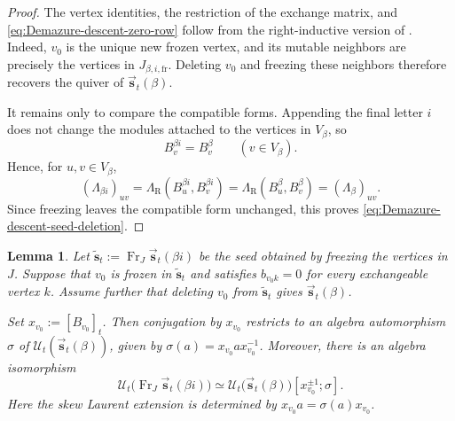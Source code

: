 \documentclass[12pt, reqno]{amsart}
\theoremstyle{plain}
\newtheorem{lemma}[theorem]{Lemma}
\theoremstyle{definition}
\numberwithin{equation}{section}
\newcommand{\LambdaR}{\Lambda_{\mathrm R}}
\begin{document}
\begin{proof}
The vertex identities, the restriction of the exchange matrix, and
\eqref{eq:Demazure-descent-zero-row} follow from the right-inductive
version of
\cite[Lemma~4.47 and Remark~4.48]{casals2025cluster}. Indeed, \(v_0\)
is the unique new frozen vertex, and its mutable neighbors are
precisely the vertices in \(J_{\beta,i,\mathrm{fr}}\). Deleting
\(v_0\) and freezing these neighbors therefore recovers the quiver of
\(\overrightarrow{\mathbf s}_t(\beta)\).

It remains only to compare the compatible forms. Appending the final
letter \(i\) does not change the modules attached to the vertices in
\(V_\beta\), so
\[
    B_v^{\beta i}=B_v^\beta
    \qquad(v\in V_\beta).
\]
Hence, for \(u,v\in V_\beta\),
\[
    (\Lambda_{\beta i})_{uv}
    =
    \LambdaR(B_u^{\beta i},B_v^{\beta i})
    =
    \LambdaR(B_u^\beta,B_v^\beta)
    =
    (\Lambda_\beta)_{uv}.
\]
Since freezing leaves the compatible form unchanged, this proves
\eqref{eq:Demazure-descent-seed-deletion}.
\end{proof}

\begin{lemma}\label{lem:upper-skew-Laurent-extension}
Let
\(\widetilde{\mathbf s}_t
:=\operatorname{Fr}_{J}
\overrightarrow{\mathbf s}_t(\beta i)\)
be the seed obtained by freezing the vertices in \(J\). Suppose that
\(v_0\) is frozen in \(\widetilde{\mathbf s}_t\) and satisfies
\(b_{v_0k}=0\) for every exchangeable vertex \(k\). Assume further
that deleting \(v_0\) from \(\widetilde{\mathbf s}_t\) gives
\(\overrightarrow{\mathbf s}_t(\beta)\).

Set \(x_{v_0}:=[B_{v_0}]_t\). Then conjugation by \(x_{v_0}\)
restricts to an algebra automorphism
\(\sigma\) of
\(\mathcal U_t(\overrightarrow{\mathbf s}_t(\beta))\), given by
\(\sigma(a)=x_{v_0}ax_{v_0}^{-1}\). Moreover, there is an algebra
isomorphism
\begin{equation}\label{eq:upper-skew-Laurent-extension}
    \mathcal U_t\bigl(
        \operatorname{Fr}_{J}
        \overrightarrow{\mathbf s}_t(\beta i)
    \bigr)
    \simeq
    \mathcal U_t\bigl(
        \overrightarrow{\mathbf s}_t(\beta)
    \bigr)
    [x_{v_0}^{\pm1};\sigma].
\end{equation}
Here the skew Laurent extension is determined by
\(x_{v_0}a=\sigma(a)x_{v_0}\).
\end{lemma}
\end{document}
